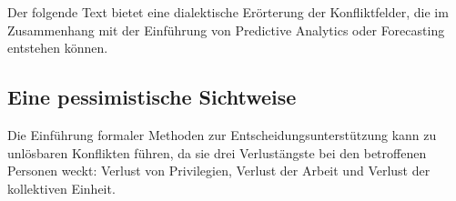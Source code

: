 

Der folgende Text bietet eine dialektische Erörterung der Konfliktfelder, die im
Zusammenhang mit der Einführung von Predictive Analytics oder Forecasting entstehen
können.


\subsection{Eine pessimistische Sichtweise}
\label{Pessimistisch}

Die Einführung formaler Methoden zur Entscheidungsunterstützung kann zu unlösbaren Konflikten führen,
da sie drei Verlustängste bei den betroffenen Personen weckt: Verlust von Privilegien,
Verlust der Arbeit und Verlust der kollektiven Einheit. 

